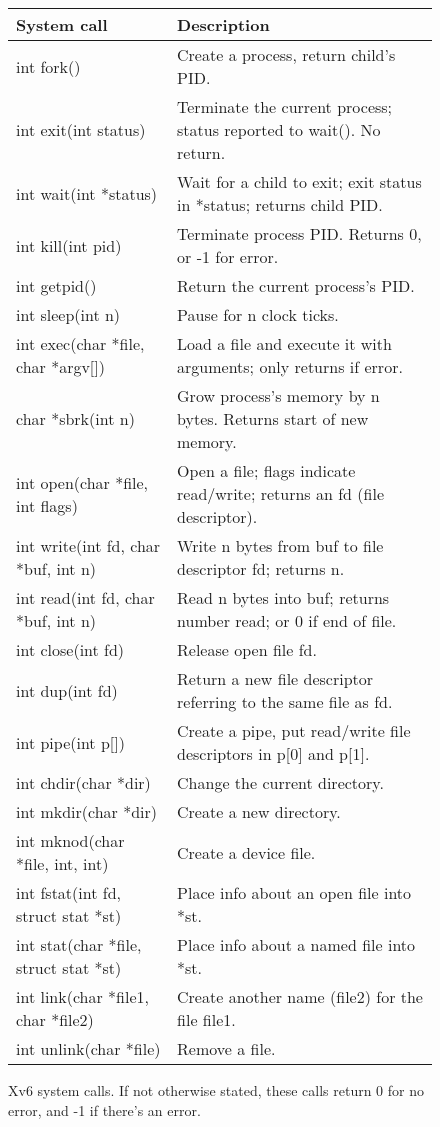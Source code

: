 \begin{figure}[t]
\center
\begin{tabular}{ll}
{\bf System call} & {\bf Description} \\
\midrule
int fork() & Create a process, return child's PID. \\
int exit(int status) & Terminate the current process; status reported to wait(). No return. \\
int wait(int *status) & Wait for a child to exit; exit status in *status; returns child PID. \\
int kill(int pid) & Terminate process PID. Returns 0, or -1 for error. \\
int getpid() & Return the current process's PID. \\
int sleep(int n) & Pause for n clock ticks. \\
int exec(char *file, char *argv[]) & Load a file and execute it with arguments; only returns if error. \\
char *sbrk(int n) & Grow process's memory by n bytes. Returns start of new memory. \\
int open(char *file, int flags) & Open a file; flags indicate read/write; returns an fd (file descriptor). \\
int write(int fd, char *buf, int n) & Write n bytes from buf to file descriptor fd; returns n. \\
int read(int fd, char *buf, int n) & Read n bytes into buf; returns number read; or 0 if end of file. \\
int close(int fd) & Release open file fd. \\
int dup(int fd) & Return a new file descriptor referring to the same file as fd.\\
int pipe(int p[]) & Create a pipe, put read/write file descriptors in p[0] and p[1]. \\
int chdir(char *dir) & Change the current directory. \\
int mkdir(char *dir) & Create a new directory. \\
int mknod(char *file, int, int) & Create a device file. \\
int fstat(int fd, struct stat *st) & Place info about an open file into *st. \\
int stat(char *file, struct stat *st) & Place info about a named file into *st. \\
int link(char *file1, char *file2) & Create another name (file2) for the file file1. \\
int unlink(char *file) & Remove a file. \\
\end{tabular}
\caption{Xv6 system calls. If not otherwise stated, these calls return
0 for no error, and -1 if there's an error.}
\label{fig:api}
\end{figure}

